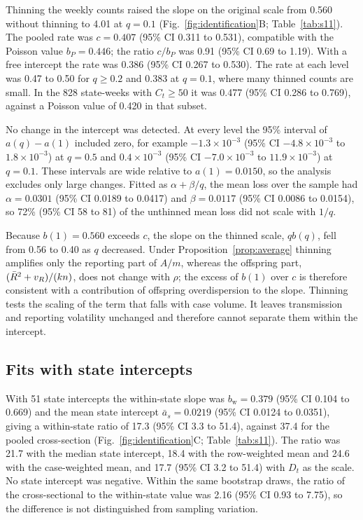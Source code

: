 Thinning the weekly counts raised the slope on the original scale from 0.560 without thinning to 4.01 at $q=0.1$ (Fig.~\ref{fig:identification}B; Table~\ref{tab:s11}). The pooled rate was $c=0.407$ (95\% CI 0.311 to 0.531), compatible with the Poisson value $b_P=0.446$; the ratio $c/b_P$ was 0.91 (95\% CI 0.69 to 1.19). With a free intercept the rate was 0.386 (95\% CI 0.267 to 0.530). The rate at each level was 0.47 to 0.50 for $q\ge0.2$ and 0.383 at $q=0.1$, where many thinned counts are small. In the 828 state-weeks with $C_t\ge50$ it was 0.477 (95\% CI 0.286 to 0.769), against a Poisson value of 0.420 in that subset.

No change in the intercept was detected. At every level the 95\% interval of $a(q)-a(1)$ included zero, for example $-1.3\times10^{-3}$ (95\% CI $-4.8\times10^{-3}$ to $1.8\times10^{-3}$) at $q=0.5$ and $0.4\times10^{-3}$ (95\% CI $-7.0\times10^{-3}$ to $11.9\times10^{-3}$) at $q=0.1$. These intervals are wide relative to $a(1)=0.0150$, so the analysis excludes only large changes. Fitted as $\alpha+\beta/q$, the mean loss over the sample had $\alpha=0.0301$ (95\% CI 0.0189 to 0.0417) and $\beta=0.0117$ (95\% CI 0.0086 to 0.0154), so 72\% (95\% CI 58 to 81) of the unthinned mean loss did not scale with $1/q$.

Because $b(1)=0.560$ exceeds $c$, the slope on the thinned scale, $qb(q)$, fell from 0.56 to 0.40 as $q$ decreased. Under Proposition~\ref{prop:average} thinning amplifies only the reporting part of $A/m$, whereas the offspring part, $(\bar{R}^2+v_R)/(kn)$, does not change with $\rho$; the excess of $b(1)$ over $c$ is therefore consistent with a contribution of offspring overdispersion to the slope. Thinning tests the scaling of the term that falls with case volume. It leaves transmission and reporting volatility unchanged and therefore cannot separate them within the intercept.

\subsection{Fits with state intercepts}
\label{sec:res-fe}

With 51 state intercepts the within-state slope was $b_{\mathrm{w}}=0.379$ (95\% CI 0.104 to 0.669) and the mean state intercept $\bar{a}_s=0.0219$ (95\% CI 0.0124 to 0.0351), giving a within-state ratio of 17.3 (95\% CI 3.3 to 51.4), against 37.4 for the pooled cross-section (Fig.~\ref{fig:identification}C; Table~\ref{tab:s11}). The ratio was 21.7 with the median state intercept, 18.4 with the row-weighted mean and 24.6 with the case-weighted mean, and 17.7 (95\% CI 3.2 to 51.4) with $D_t$ as the scale. No state intercept was negative. Within the same bootstrap draws, the ratio of the cross-sectional to the within-state value was 2.16 (95\% CI 0.93 to 7.75), so the difference is not distinguished from sampling variation.


